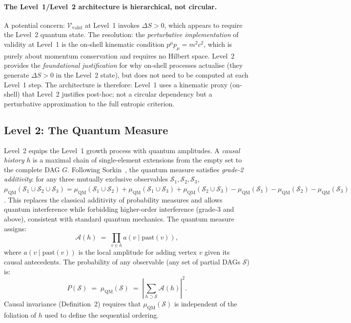 \documentclass[11pt,a4paper]{article}
\theoremstyle{plain}
\theoremstyle{definition}
\theoremstyle{remark}
\newcommand{\muC}{\mu_{\mathrm{QM}}}   %
\begin{document}
\paragraph{The Level~1/Level~2 architecture is hierarchical, not circular.}
A potential concern: $\mathcal{V}_{\mathrm{valid}}$ at Level~1 invokes
$\Delta S > 0$, which appears to require the Level~2 quantum state.
The resolution: the \emph{perturbative implementation} of validity at
Level~1 is the on-shell kinematic condition $p^\mu p_\mu = m^2c^2$,
which is purely about momentum conservation and requires no Hilbert space.
Level~2 provides the \emph{foundational justification} for why on-shell
processes actualise (they generate $\Delta S > 0$ in the Level~2 state),
but does not need to be computed at each Level~1 step.
The architecture is therefore: Level~1 uses a kinematic proxy (on-shell)
that Level~2 justifies post-hoc; not a circular dependency but a
perturbative approximation to the full entropic criterion.



\subsection{Level 2: The Quantum Measure}

Level~2 equips the Level~1 growth process with quantum amplitudes. A
\emph{causal history} $h$ is a maximal chain of single-element extensions
from the empty set to the complete DAG $G$. Following Sorkin~\citep{Sorkin1994},
the quantum measure satisfies \emph{grade-2 additivity}: for any three
mutually exclusive observables $\mathcal{S}_1, \mathcal{S}_2, \mathcal{S}_3$,
$\muC(\mathcal{S}_1 \cup \mathcal{S}_2 \cup \mathcal{S}_3) =
\muC(\mathcal{S}_1 \cup \mathcal{S}_2) + \muC(\mathcal{S}_1 \cup \mathcal{S}_3)
+ \muC(\mathcal{S}_2 \cup \mathcal{S}_3) - \muC(\mathcal{S}_1) -
\muC(\mathcal{S}_2) - \muC(\mathcal{S}_3)$.
This replaces the classical additivity of probability measures and allows
quantum interference while forbidding higher-order interference (grade-3
and above), consistent with standard quantum mechanics.
The quantum measure assigns:
\begin{equation}
  \mathcal{A}(h) \;=\; \prod_{v \in h} a(v \mid \mathrm{past}(v)),
  \label{eq:local_amplitude}
\end{equation}
where $a(v \mid \mathrm{past}(v))$ is the local amplitude for adding vertex
$v$ given its causal antecedents. The probability of any observable
(any set of partial DAGs $\mathcal{S}$) is:
\begin{equation}
  P(\mathcal{S}) \;=\; \muC(\mathcal{S})
  \;=\; \left|\sum_{h \supset \mathcal{S}} \mathcal{A}(h)\right|^2.
  \label{eq:qm_probability}
\end{equation}
Causal invariance (Definition~2) requires that $\muC(\mathcal{S})$ is
independent of the foliation of $h$ used to define the sequential ordering.
\end{document}

